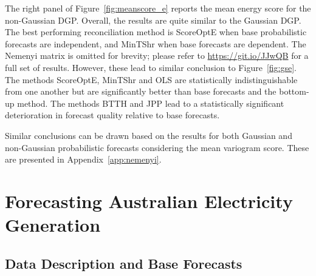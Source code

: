 \documentclass[a4paper,12pt]{article}
\theoremstyle{definition}
\begin{document}
The right panel of Figure~\ref{fig:meanscore_e} reports the mean energy score for the non-Gaussian DGP\@. Overall, the results are quite similar to the Gaussian DGP\@. The best performing reconciliation method is ScoreOptE when base probabilistic forecasts are independent, and MinTShr when base forecasts are dependent. The Nemenyi matrix is omitted for brevity; please refer to \url{https://git.io/JJwQB} for a full set of results. However, these lead to similar conclusion to Figure~\ref{fig:gse}. The methods ScoreOptE, MinTShr and OLS are statistically indistinguishable from one another but are significantly better than base forecasts and the bottom-up method. The methods BTTH and JPP lead to a statistically significant deterioration in forecast quality relative to base forecasts.

Similar conclusions can be drawn based on the results for both Gaussian and non-Gaussian probabilistic forecasts considering the mean variogram score. These are presented in Appendix~\ref{app:nemenyi}.



\section{Forecasting Australian Electricity Generation}\label{sec:Application}

\subsection{Data Description and Base Forecasts}\label{sec:datadesc}
\end{document}
